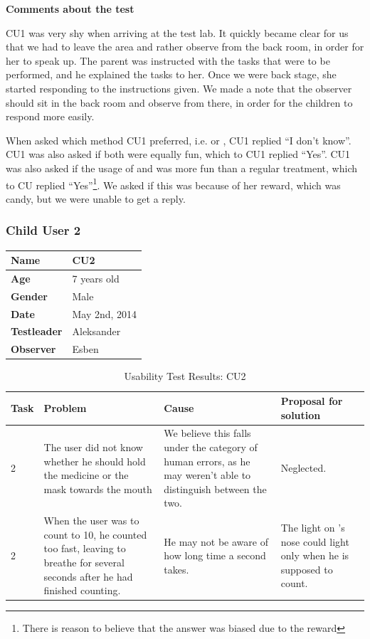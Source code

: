 \textbf{Comments about the test}

CU1 was very shy when arriving at the test lab. It quickly became clear for us that we had to leave the area and rather observe from the back room, in order for her to speak up. The parent was instructed with the tasks that were to be performed, and he explained the tasks to her. Once we were back stage, she started responding to the instructions given. We made a note that the observer should sit in the back room and observe from there, in order for the children to respond more easily.   

When asked which method CU1 preferred, i.e. \app{} or \ab{}, CU1 replied ``I don't know''. CU1 was also asked if both were equally fun, which to CU1 replied ``Yes''. CU1 was also asked if the usage of \app{} and \ab{} was more fun than a regular treatment, which to CU replied ``Yes''\footnote{There is reason to believe that the answer was biased due to the reward}. We asked if this was because of her reward, which was candy, but we were unable to get a reply. 

\subsubsection{Child User 2}
\begin{table}[H]
\centering
\begin{tabular}{| p{4.0cm} | p{4.0cm} |}
\hline
 \textbf{Name} & CU2 \\
 \hline
 \textbf{Age} & 7 years old \\
 \hline 
 \textbf{Gender} & Male \\
 \hline
 \textbf{Date} & May 2nd, 2014 \\
 \hline
 \textbf{Testleader} & Aleksander \\
 \hline
 \textbf{Observer} & Esben \\
 \hline
\end{tabular}
\end{table}

\begin{table}[H]
\centering
\begin{tabular}{| p{1.0cm} | p{4.0cm} | p{4.0cm} | p{4.0cm} |}
\hline
	\textbf{Task} & \textbf{Problem} & \textbf{Cause} & \textbf{Proposal for solution} \\
	\hline
	2 & The user did not know whether he should hold the medicine or the mask towards the mouth & We believe this falls under the category of human errors, as he may weren't able to distinguish between the two. & Neglected.  \\
	\hline
	2 & When the user was to count to 10, he counted too fast, leaving \ab{} to breathe for several seconds after he had finished counting. & He may not be aware of how long time a second takes.  & The light on \ab{}'s nose could light only when he is supposed to count. \\
	\hline
\end{tabular}
\caption{Usability Test Results: CU2}
\label{tab:testchild2}
\end{table}

